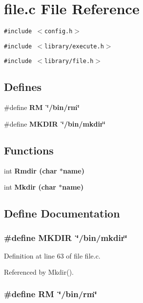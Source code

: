 \section{file.c File Reference}
\label{file_8c}
{\tt \#include $<$config.h$>$}\par
{\tt \#include $<$library/execute.h$>$}\par
{\tt \#include $<$library/file.h$>$}\par
\subsection*{Defines}
\begin{CompactItemize}
\item 
\#define \bf{RM}~\char`\"{}/bin/rm\char`\"{}
\item 
\#define \bf{MKDIR}~\char`\"{}/bin/mkdir\char`\"{}
\end{CompactItemize}
\subsection*{Functions}
\begin{CompactItemize}
\item 
int \bf{Rmdir} (char $\ast$\bf{name})
\item 
int \bf{Mkdir} (char $\ast$\bf{name})
\end{CompactItemize}


\subsection{Define Documentation}
\subsubsection{\setlength{\rightskip}{0pt plus 5cm}\#define MKDIR~\char`\"{}/bin/mkdir\char`\"{}}\label{file_8c_9165713ff17c8ca8fc2951e82d1a6e57}




Definition at line 63 of file file.c.

Referenced by Mkdir().
\subsubsection{\setlength{\rightskip}{0pt plus 5cm}\#define RM~\char`\"{}/bin/rm\char`\"{}}\label{file_8c_4608958cdf4c8b8ff0a6e301c4c23ae1}




